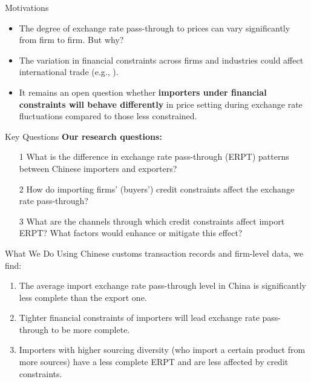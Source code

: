 \documentclass[10pt]{beamer}
\begin{document}
\begin{frame}{Motivations}
	\begin{itemize}
		\item The degree of exchange rate pass-through to prices can vary significantly from firm to firm. But why? 
		\item The variation in financial constraints across firms and industries could affect international trade (e.g., \cite{manova2013}).
		\item It remains an open question whether \textbf{importers under financial constraints will behave differently} in price setting during exchange rate fluctuations compared to those less constrained.
	\end{itemize}
\end{frame}

\begin{frame}{Key Questions}
\textbf{Our research questions:}
	\begin{itemize}
		\item [1] What is the difference in exchange rate pass-through (ERPT) patterns between Chinese importers and exporters?
		\item [2] How do importing firms' (buyers') credit constraints affect the exchange rate pass-through?
		\item [3] What are the channels through which credit constraints affect import ERPT? What factors would enhance or mitigate this effect?
	\end{itemize}
\end{frame}

\begin{frame}{What We Do}
Using Chinese customs transaction records and firm-level data, we find:	
	\begin{enumerate}
		\item The average import exchange rate pass-through level in China is significantly less complete than the export one.
		\item Tighter financial constraints of importers will lead exchange rate pass-through to be more complete.
		\item Importers with higher sourcing diversity (who import a certain product from more sources) have a less complete ERPT and are less affected by credit constraints.
	\end{enumerate}	
\end{frame}
\end{document}
